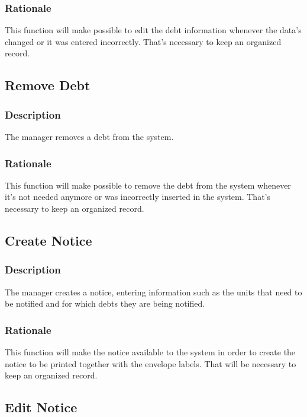 \documentclass{scrreprt}
\begin{document}
\subsubsection{Rationale}

This function will make possible to edit the debt information whenever the data's changed or it was entered incorrectly. That's necessary to keep an organized record.

\subsection{Remove Debt}
\subsubsection{Description}

The manager removes a debt from the system.

\subsubsection{Rationale}

This function will make possible to remove the debt from the system whenever it's not needed anymore or was incorrectly inserted in the system. That's necessary to keep an organized record.

\subsection{Create Notice}
\subsubsection{Description}

The manager creates a notice, entering information such as the units that need to be notified and for which debts they are being notified.

\subsubsection{Rationale}

This function will make the notice available to the system in order to create the notice to be printed together with the envelope labels. That will be necessary to keep an organized record.

\subsection{Edit Notice}
\end{document}
